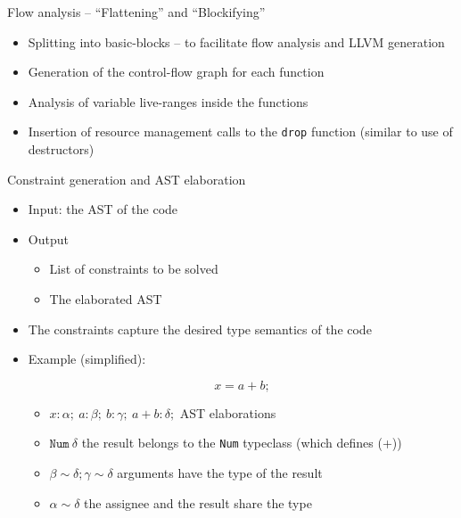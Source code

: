 \documentclass[aspectratio=169]{beamer}
\newcommand{\li}[1]{\lstinline{#1}}
\begin{document}
\begin{frame}{Flow analysis -- ``Flattening'' and ``Blockifying''}
  \begin{itemize}
    \item Splitting into basic-blocks -- to facilitate flow analysis and LLVM generation
    \item Generation of the control-flow graph for each function
    \item Analysis of variable live-ranges inside the functions
    \item Insertion of resource management calls to the \li{drop} function (similar to use of destructors)
  \end{itemize}
\end{frame}

\begin{frame}{Constraint generation and AST elaboration}
  \begin{itemize}
    \item[\faSignIn] Input: the AST of the code
    \vfill
    \item[\faSignOut] Output
    \begin{itemize}
      \item List of constraints to be solved
      \item The elaborated AST
    \end{itemize}

    \item The constraints capture the desired type semantics of the code
    \item Example (simplified):
    
    $$x = a + b;$$
    
    \begin{itemize}
      \item $x : \alpha;\ a : \beta;\ b : \gamma;\ a + b : \delta;$ \hfill AST elaborations
      \item $\texttt{Num}\ \delta$ \hfill the result belongs to the \texttt{Num} typeclass (which defines (+))
      \item $\beta \sim \delta; \gamma \sim \delta$ \hfill arguments have the type of the result
      \item $\alpha \sim \delta$ \hfill the assignee and the result share the type
    \end{itemize}
  \end{itemize}
\end{frame}
\end{document}
